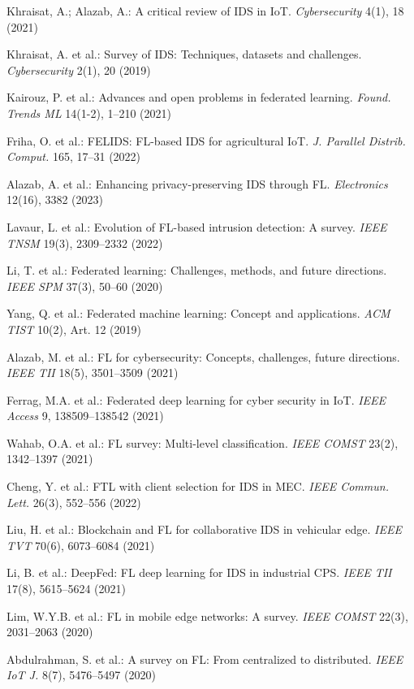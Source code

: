 \documentclass[a4paper]{article}
\begin{document}
\begin{enumerate}[leftmargin=0.8cm, itemsep=0pt, parsep=0pt, label={[\arabic*]}]
\item Khraisat, A.; Alazab, A.: A critical review of IDS in IoT. \textit{Cybersecurity} 4(1), 18 (2021)
\item Khraisat, A. et al.: Survey of IDS: Techniques, datasets and challenges. \textit{Cybersecurity} 2(1), 20 (2019)
\item Kairouz, P. et al.: Advances and open problems in federated learning. \textit{Found. Trends ML} 14(1-2), 1--210 (2021)
\item Friha, O. et al.: FELIDS: FL-based IDS for agricultural IoT. \textit{J. Parallel Distrib. Comput.} 165, 17--31 (2022)
\item Alazab, A. et al.: Enhancing privacy-preserving IDS through FL. \textit{Electronics} 12(16), 3382 (2023)
\item Lavaur, L. et al.: Evolution of FL-based intrusion detection: A survey. \textit{IEEE TNSM} 19(3), 2309--2332 (2022)
\item Li, T. et al.: Federated learning: Challenges, methods, and future directions. \textit{IEEE SPM} 37(3), 50--60 (2020)
\item Yang, Q. et al.: Federated machine learning: Concept and applications. \textit{ACM TIST} 10(2), Art. 12 (2019)
\item Alazab, M. et al.: FL for cybersecurity: Concepts, challenges, future directions. \textit{IEEE TII} 18(5), 3501--3509 (2021)
\item Ferrag, M.A. et al.: Federated deep learning for cyber security in IoT. \textit{IEEE Access} 9, 138509--138542 (2021)
\item Wahab, O.A. et al.: FL survey: Multi-level classification. \textit{IEEE COMST} 23(2), 1342--1397 (2021)
\item Cheng, Y. et al.: FTL with client selection for IDS in MEC. \textit{IEEE Commun. Lett.} 26(3), 552--556 (2022)
\item Liu, H. et al.: Blockchain and FL for collaborative IDS in vehicular edge. \textit{IEEE TVT} 70(6), 6073--6084 (2021)
\item Li, B. et al.: DeepFed: FL deep learning for IDS in industrial CPS. \textit{IEEE TII} 17(8), 5615--5624 (2021)
\item Lim, W.Y.B. et al.: FL in mobile edge networks: A survey. \textit{IEEE COMST} 22(3), 2031--2063 (2020)
\item Abdulrahman, S. et al.: A survey on FL: From centralized to distributed. \textit{IEEE IoT J.} 8(7), 5476--5497 (2020)

\end{enumerate}
\end{document}
